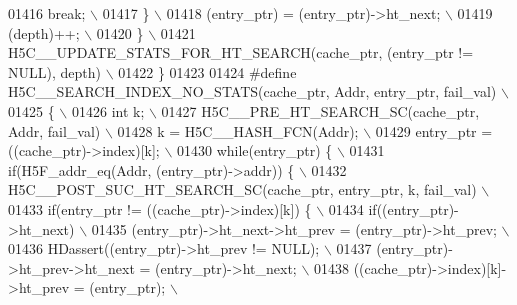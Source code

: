 \begin{DoxyCode}
01416 \textcolor{preprocessor}{            break;                                                          \(\backslash\)}
01417 \textcolor{preprocessor}{        \}                                                                   \(\backslash\)}
01418 \textcolor{preprocessor}{        (entry\_ptr) = (entry\_ptr)->ht\_next;                                 \(\backslash\)}
01419 \textcolor{preprocessor}{        (depth)++;                                                          \(\backslash\)}
01420 \textcolor{preprocessor}{    \}                                                                       \(\backslash\)}
01421 \textcolor{preprocessor}{    H5C\_\_UPDATE\_STATS\_FOR\_HT\_SEARCH(cache\_ptr, (entry\_ptr != NULL), depth)  \(\backslash\)}
01422 \textcolor{preprocessor}{\}}
01423 
01424 \textcolor{preprocessor}{#define H5C\_\_SEARCH\_INDEX\_NO\_STATS(cache\_ptr, Addr, entry\_ptr, fail\_val)    \(\backslash\)}
01425 \textcolor{preprocessor}{\{                                                                           \(\backslash\)}
01426 \textcolor{preprocessor}{    int k;                                                                  \(\backslash\)}
01427 \textcolor{preprocessor}{    H5C\_\_PRE\_HT\_SEARCH\_SC(cache\_ptr, Addr, fail\_val)                        \(\backslash\)}
01428 \textcolor{preprocessor}{    k = H5C\_\_HASH\_FCN(Addr);                                                \(\backslash\)}
01429 \textcolor{preprocessor}{    entry\_ptr = ((cache\_ptr)->index)[k];                                    \(\backslash\)}
01430 \textcolor{preprocessor}{    while(entry\_ptr) \{                                                      \(\backslash\)}
01431 \textcolor{preprocessor}{        if(H5F\_addr\_eq(Addr, (entry\_ptr)->addr)) \{                          \(\backslash\)}
01432 \textcolor{preprocessor}{            H5C\_\_POST\_SUC\_HT\_SEARCH\_SC(cache\_ptr, entry\_ptr, k, fail\_val)   \(\backslash\)}
01433 \textcolor{preprocessor}{            if(entry\_ptr != ((cache\_ptr)->index)[k]) \{                      \(\backslash\)}
01434 \textcolor{preprocessor}{                if((entry\_ptr)->ht\_next)                                    \(\backslash\)}
01435 \textcolor{preprocessor}{                    (entry\_ptr)->ht\_next->ht\_prev = (entry\_ptr)->ht\_prev;   \(\backslash\)}
01436 \textcolor{preprocessor}{                HDassert((entry\_ptr)->ht\_prev != NULL);                     \(\backslash\)}
01437 \textcolor{preprocessor}{                (entry\_ptr)->ht\_prev->ht\_next = (entry\_ptr)->ht\_next;       \(\backslash\)}
01438 \textcolor{preprocessor}{                ((cache\_ptr)->index)[k]->ht\_prev = (entry\_ptr);             \(\backslash\)}

\end{DoxyCode}
